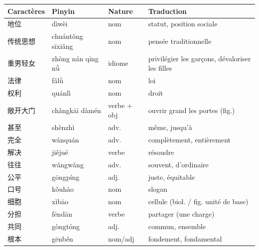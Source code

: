 \documentclass[11pt]{article}
\begin{document}
\begin{center}
\begin{tabularx}{\linewidth}{|X|X|X|X|}
\hline
\rowcolor{popblueL} \textbf{Caractères} & \textbf{Pinyin} & \textbf{Nature} & \textbf{Traduction} \\
\hline
地位 & dìwèi & nom & statut, position sociale \\
\hline
传统思想 & chuántǒng sīxiǎng & nom & pensée traditionnelle \\
\hline
重男轻女 & zhòng nán qīng nǚ & idiome & privilégier les garçons, dévaloriser les filles \\
\hline
法律 & fǎlǜ & nom & loi \\
\hline
权利 & quánlì & nom & droit \\
\hline
敞开大门 & chǎngkāi dàmén & verbe + obj & ouvrir grand les portes (fig.) \\
\hline
甚至 & shènzhì & adv. & même, jusqu'à \\
\hline
完全 & wánquán & adv. & complètement, entièrement \\
\hline
解决 & jiějué & verbe & résoudre \\
\hline
往往 & wǎngwǎng & adv. & souvent, d'ordinaire \\
\hline
公平 & gōngpíng & adj. & juste, équitable \\
\hline
口号 & kǒuhào & nom & slogan \\
\hline
细胞 & xìbāo & nom & cellule (biol. / fig. unité de base) \\
\hline
分担 & fēndān & verbe & partager (une charge) \\
\hline
共同 & gòngtóng & adj. & commun, ensemble \\
\hline
根本 & gēnběn & nom/adj & fondement, fondamental \\
\hline
\end{tabularx}
\end{center}
\end{document}

